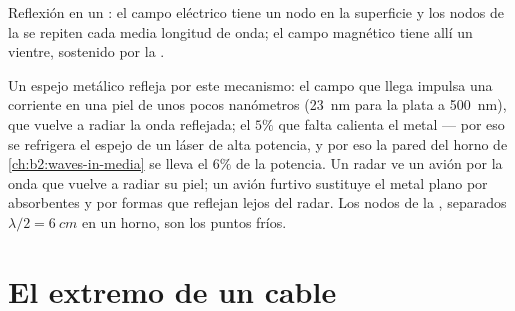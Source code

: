 \begin{omfigure}

{\small Reflexión en un : el campo eléctrico tiene un
nodo en la superficie y los nodos de la  se repiten cada
media longitud de onda; el campo magnético tiene allí un vientre, sostenido
por la .}
\end{omfigure}

\begin{example}\label{ex:b2:wave-interfaces:conductoruses}
Un espejo metálico refleja por este mecanismo: el campo que llega impulsa
una corriente en una piel de unos pocos nanómetros (\qty{23}{nm} para la plata a
\qty{500}{nm}), que vuelve a radiar la onda reflejada; el $5\%$ que falta
calienta el metal --- por eso se refrigera el espejo de un láser de alta potencia,
y por eso la pared del horno de \cref{ch:b2:waves-in-media} se lleva el $6\%$ de la
potencia. Un radar ve un avión por la onda que vuelve a radiar su piel; un
avión furtivo sustituye el metal plano por absorbentes y por formas que
reflejan lejos del radar. Los nodos de la , separados $\lambda/2 =
\qty{6}{cm}$ en un horno, son los puntos fríos.
\end{example}

\section{El extremo de un cable}

